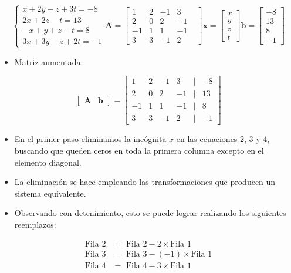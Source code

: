 \documentclass[]{book}
\providecommand{\tightlist}{%
  \setlength{\itemsep}{0pt}\setlength{\parskip}{0pt}}
\begin{document}
\[
\begin{cases} 
x+2y-z+3t=-8 \\
2x+2z-t=13 \\
-x+y+z-t=8\\
3x+3y-z+2t = -1
\end{cases}
\mathbf{A}=
\begin{bmatrix}
1 & 2 & -1 & 3 \\
2 & 0 & 2 & -1 \\
-1 & 1 & 1 & -1 \\
3 & 3 & -1 & 2 &  
\end{bmatrix}
\mathbf{x} = 
\begin{bmatrix}
x \\ y \\ z \\ t
\end{bmatrix}
\mathbf{b} =
\begin{bmatrix}
-8 \\ 13 \\ 8 \\ -1
\end{bmatrix}
\]

\begin{itemize}
\tightlist
\item
  Matriz aumentada:
\end{itemize}

\[
\begin{bmatrix}
    \mathbf{A} & \mathbf{b}
\end{bmatrix}
=
\begin{bmatrix}
    1 & 2 & -1 & 3 &|& -8\\
    2 & 0 & 2 & -1 &|& 13\\
    -1 & 1 & 1 & -1 &|& 8\\
    3 & 3 & -1 & 2 &|& -1  
\end{bmatrix}
\]

\begin{itemize}
\tightlist
\item
  En el primer paso eliminamos la incógnita \(x\) en las ecuaciones 2, 3 y 4, buscando que queden ceros en toda la primera columna excepto en el elemento diagonal.
\item
  La eliminación se hace empleando las transformaciones que producen un sistema equivalente.
\item
  Observando con detenimiento, esto se puede lograr realizando los siguientes reemplazos:
\end{itemize}

\[
\begin{array}{cl}
\text{Fila 2} &= \text{ Fila 2} - 2 \times \text{Fila 1} \\ 
\text{Fila 3} &= \text{ Fila 3} - (-1) \times \text{Fila 1} \\
\text{Fila 4} &= \text{ Fila 4} - 3 \times \text{Fila 1} 
\end{array}
\]
\end{document}
